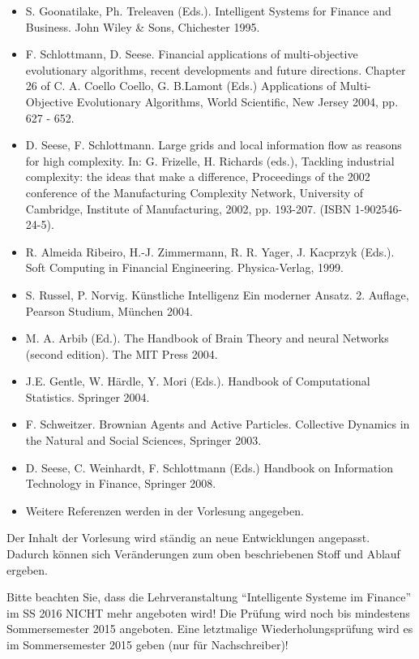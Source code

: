 \begin{course}
\begin{literature}
 \begin{itemize}\item S. Goonatilake, Ph. Treleaven (Eds.). Intelligent Systems for Finance and Business. John Wiley \& Sons, Chichester 1995.  \item F. Schlottmann, D. Seese. Financial applications of multi-objective evolutionary algorithms, recent developments and future directions. Chapter 26 of C. A. Coello Coello, G. B.Lamont (Eds.) Applications of Multi-Objective Evolutionary Algorithms, World Scientific, New Jersey 2004, pp. 627 - 652.  \item D. Seese, F. Schlottmann. Large grids and local information flow as reasons for high complexity. In: G. Frizelle, H. Richards (eds.), Tackling industrial complexity: the ideas that make a difference, Proceedings of the 2002 conference of the Manufacturing Complexity Network, University of Cambridge, Institute of Manufacturing, 2002, pp. 193-207. (ISBN 1-902546-24-5).  \item R. Almeida Ribeiro, H.-J. Zimmermann, R. R. Yager, J. Kacprzyk (Eds.). Soft Computing in Financial Engineering. Physica-Verlag, 1999.  \item S. Russel, P. Norvig. Künstliche Intelligenz Ein moderner Ansatz. 2. Auflage, Pearson Studium, München 2004.  \item M. A. Arbib (Ed.). The Handbook of Brain Theory and neural Networks (second edition). The MIT Press 2004.  \item J.E. Gentle, W. Härdle, Y. Mori (Eds.). Handbook of Computational Statistics. Springer 2004.  \item F. Schweitzer. Brownian Agents and Active Particles. Collective Dynamics in the Natural and Social Sciences, Springer 2003.  \item D. Seese, C. Weinhardt, F. Schlottmann (Eds.) Handbook on Information Technology in Finance, Springer 2008.  \item Weitere Referenzen werden in der Vorlesung angegeben.  \end{itemize}\end{literature}

\begin{remarks}Der Inhalt der Vorlesung wird ständig an neue Entwicklungen angepasst. Dadurch können sich Veränderungen zum oben beschriebenen Stoff und Ablauf ergeben.

 

Bitte beachten Sie, dass die Lehrveranstaltung “Intelligente Systeme im Finance” im SS 2016 NICHT mehr angeboten wird! Die Prüfung wird noch bis mindestens Sommersemester 2015 angeboten. Eine letztmalige Wiederholungsprüfung wird es im Sommersemester 2015 geben (nur für Nachschreiber)!

\end{remarks}

\end{course}